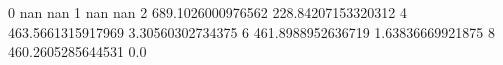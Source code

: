 0 nan nan
1 nan nan
2 689.1026000976562 228.84207153320312
4 463.5661315917969 3.30560302734375
6 461.8988952636719 1.63836669921875
8 460.2605285644531 0.0
